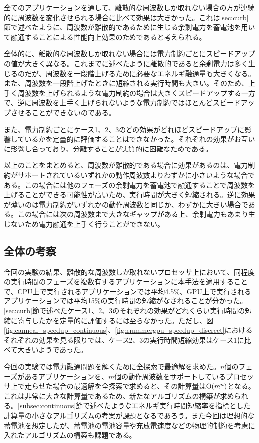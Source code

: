 全てのアプリケーションを通して、離散的な周波数しか取れない場合の方が連続的に周波数を変化させられる場合に比べて効果は大きかった。これは\ref{sec:curb}節で述べたように、周波数が離散的であるために生じる余剰電力を蓄電池を用いて融通することによる性能向上効果のためであると考えられる。

全体的に、離散的な周波数しか取れない場合には電力制約ごとにスピードアップの値が大きく異なる。これまでに述べたように離散的であると余剰電力は多く生じるのだが、周波数を一段階上げるために必要なエネルギ融通量も大きくなる。また、周波数を一段階上げたときに短縮される実行時間も大きい。そのため、上手く周波数を上げられるような電力制約の場合は大きくスピードアップする一方で、逆に周波数を上手く上げられないような電力制約ではほとんどスピードアップさせることができないのである。

また、電力制約ごとにケース1、2、3のどの効果がどれほどスピードアップに影響しているかを定量的に評価することはできなかった。それぞれの効果がお互いに影響し合っており、分離することが実質的に困難なためである。

以上のことをまとめると、周波数が離散的である場合に効果があるのは、電力制約がサポートされているいずれかの動作周波数よりわずかに小さいような場合である。この場合には他のフェーズの余剰電力を蓄電池で融通することで周波数を上げることができる可能性が高いため、実行時間が大きく短縮される。逆に効果が薄いのは電力制約がいずれかの動作周波数と同じか、わずかに大きい場合である。この場合には次の周波数まで大きなギャップがある上、余剰電力もあまり生じないため電力融通を上手く行うことができない。


\subsection{全体の考察}
\label{sebsec:whole}

今回の実験の結果、離散的な周波数しか取れないプロセッサ上において、同程度の実行時間のフェーズを複数有するアプリケーションに本手法を適用することで、CPU上で実行されるアプリケーションでは平均4.5\%、GPU上で実行されるアプリケーションでは平均15\%の実行時間の短縮がなされることが分かった。\ref{sec:curb}節で述べたケース1、2、3のそれぞれの効果がどれくらい実行時間の短縮に寄与したかを定量的に評価するには至らなかった。ただし、図\ref{fig:canneal_speedup_continuous}、\ref{fig:mummergpu_speedup_discreet}におけるそれぞれの効果を見る限りでは、ケース2、3の実行時間短縮効果はケース1に比べて大きいようであった。

今回の実験では電力融通問題を解くために全探索で最適解を求めた。$n$個のフェーズがあるアプリケーションを、$m$個の動作周波数をサポートしているプロセッサ上で走らせた場合の最適解を全探索で求めると、その計算量は${\rm O}(m^n)$となる。これは非常に大きな計算量であるため、新たなアルゴリズムの構築が求められる。\ref{subsec:continuous}節で述べたようなエネルギ実行時間短縮率を指標とした計算量の小さなアルゴリズムの考案が課題となるであろう。また今回は理想的な蓄電池を想定したが、蓄電池の電池容量や充放電速度などの物理的制約を考慮に入れたアルゴリズムの構築も課題である。










